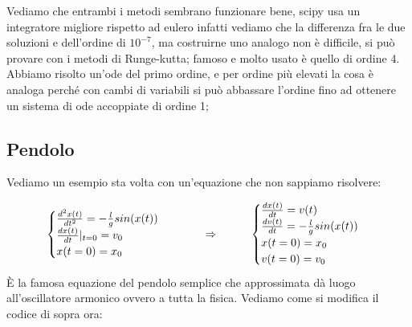 \documentclass[10pt,a4paper]{article}
\begin{document}
\begin{center}
\end{center}

Vediamo che entrambi i metodi sembrano funzionare bene, scipy usa un integratore migliore rispetto ad eulero infatti vediamo che la differenza fra le due soluzioni e dell'ordine di $10^{-7}$, ma costruirne uno analogo non è difficile, si può provare con i metodi di Runge-kutta; famoso e molto usato è quello di ordine 4.
Abbiamo risolto un'ode del primo ordine, e per ordine più elevati la cosa è analoga perché con cambi di variabili si può abbassare l'ordine fino ad ottenere un sistema di ode accoppiate di ordine 1;

\subsection{Pendolo}
Vediamo un esempio sta volta con un'equazione che non sappiamo risolvere:

\[
\begin{cases}
\frac{d^2 x(t)}{dt^2} = -\frac{l}{g}sin(x(t))	\\
\frac{d x(t)}{dt}|_{t=0} = v_0 \\
x(t=0) = x_0
\end{cases}
\hspace{10 mm}
\Rightarrow
\hspace{10 mm}
\begin{cases}
\frac{d x(t)}{dt} = v(t)	\\
\frac{d v(t)}{dt} = -\frac{l}{g}sin(x(t)) \\
x(t=0) = x_0 \\
v(t=0) = v_0
\end{cases}
\]
È la famosa equazione del pendolo semplice che approssimata dà luogo all'oscillatore armonico ovvero a tutta la fisica. Vediamo come si modifica il codice di sopra ora:
\end{document}
